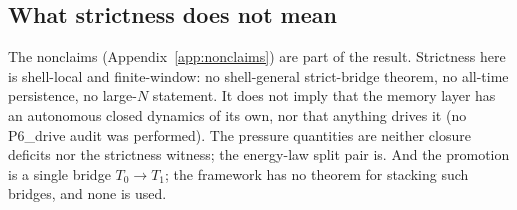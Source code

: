 \subsection{What strictness does not mean}

The nonclaims (Appendix~\ref{app:nonclaims}) are part of the result. Strictness here is
shell-local and finite-window: no shell-general strict-bridge theorem, no all-time persistence,
no large-$N$ statement. It does not imply that the memory layer has an autonomous closed dynamics
of its own, nor that anything drives it (no P6\_drive audit was performed). The pressure
quantities are neither closure deficits nor the strictness witness; the energy-law split pair is.
And the promotion is a single bridge $T_0 \to T_1$; the framework has no theorem for stacking
such bridges, and none is used.
